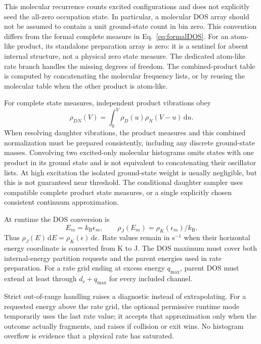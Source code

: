 \documentclass[10pt,a4paper]{article}
\newcommand{\dd}{\,\mathrm d}
\newcommand{\kb}{k_{\mathrm B}}
\begin{document}
This molecular recurrence counts excited configurations and does not explicitly
seed the all-zero occupation state. In particular, a molecular DOS array should
not be assumed to contain a unit ground-state count in bin zero. This convention
differs from the formal complete measure in Eq.~\eqref{eq:formalDOS}.
For an atom-like product, its standalone preparation array is zero: it is a
sentinel for absent internal structure, not a physical zero state measure.
The dedicated atom-like rate branch handles the missing degrees of freedom.
The combined-product table is computed by concatenating the molecular frequency
lists, or by reusing the molecular table when the other product is atom-like.

For complete state measures, independent product vibrations obey
\[
 \rho_{DN}(V)=\int_0^V\rho_D(u)\rho_N(V-u)\dd u.
\]
When resolving daughter vibrations, the product measures and this combined
normalization must be prepared consistently, including any discrete
ground-state masses. Convolving two excited-only molecular histograms omits
states with one product in its ground state and is not equivalent to
concatenating their oscillator lists. At high excitation the isolated
ground-state weight is usually negligible, but this is not guaranteed near
threshold. The conditional daughter sampler uses compatible complete product
state measures, or a single explicitly chosen consistent continuum approximation.

At runtime the DOS conversion is
\[
 E_m=\kb\epsilon_m,\qquad
 \rho_J(E_m)=\rho_K(\epsilon_m)/\kb.
\]
Thus $\rho_J(E)\dd E=\rho_K(\epsilon)\dd\epsilon$.
Rate values remain in $\mathrm{s^{-1}}$ when their horizontal energy coordinate
is converted from K to J. The DOS maximum must cover both internal-energy
partition requests and the parent energies used in rate preparation. For a rate
grid ending at excess energy $q_{\max}$, parent DOS must extend at least through
$d_c+q_{\max}$ for every included channel.

Strict out-of-range handling raises a diagnostic instead of extrapolating.
For a requested energy above the rate grid, the optional permissive runtime
mode temporarily uses the last rate value; it accepts that approximation only
when the outcome actually fragments, and raises if collision or exit wins.
No histogram overflow is evidence that a physical rate has saturated.

\clearpage
\end{document}
